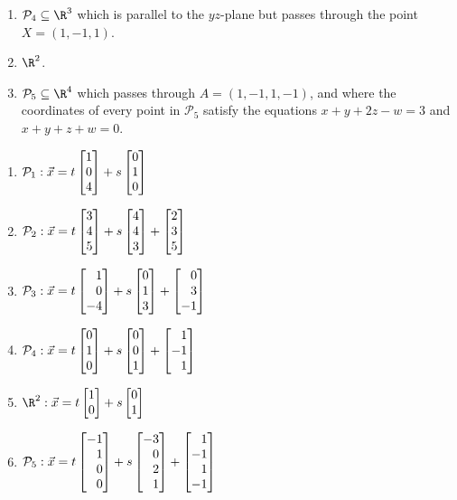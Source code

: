 \begin{exercises}
\begin{problist}
\begin{enumerate}
			\item   $\mathcal P_4\subseteq\R^3$ which is parallel to the $yz$-plane but passes through the point $X=(1,-1,1)$.
			\item   $\R^2$.
			\item   $\mathcal P_5\subseteq\R^4$ which passes through $A=(1,-1,1,-1)$,
				and where the coordinates of every point in $\mathcal P_5$ satisfy the equations $x+y+2z-w=3$
				and $x+y+z+w=0$.
		\end{enumerate}
		\begin{solution}
			\begin{enumerate}
				\item $\mathcal{P}_1: \vec{x}=t\mat{1\\0\\4}+s\mat{0\\1\\0}$
				\item $\mathcal{P}_2: \vec{x}=t\mat{3\\4\\5}+s\mat{4\\4\\3}+\mat{2\\3\\5}$
				\item $\mathcal{P}_3: \vec{x}=t\mat{1\\0\\-4}+s\mat{0\\1\\3}+\mat{0\\3\\-1}$
				\item $\mathcal{P}_4: \vec{x}=t\mat{0\\1\\0}+s\mat{0\\0\\1}+\mat{1\\-1\\1}$
				\item $\R^2: \vec{x}=t\mat{1\\0}+s\mat{0\\1}$
				\item $\mathcal{P}_5: \vec{x}=t\mat{-1\\1\\0\\0}+s\mat{-3\\0\\2\\1}+\mat{1\\-1\\1\\-1}$

\end{enumerate}
\end{solution}
\end{problist}
\end{exercises}
